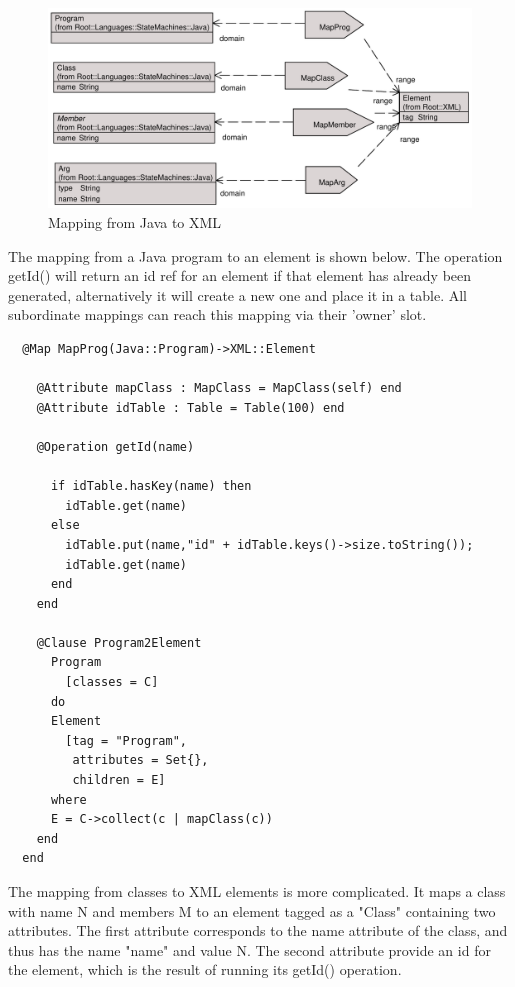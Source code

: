 \begin{figure}[htb]
\begin{center}
\includegraphics[width=14cm]{Mappings/figures/xmlmapping.pdf}
\caption{Mapping from Java to XML} \label{xmlmapping}
\end{center}
\end{figure}

The mapping from a Java program to an element is shown below. The
operation getId() will return an id ref for an element if that
element has already been generated, alternatively it will create a
new one and place it in a table. All subordinate mappings can
reach this mapping via their 'owner' slot.


\begin{lstlisting}
  @Map MapProg(Java::Program)->XML::Element

    @Attribute mapClass : MapClass = MapClass(self) end
    @Attribute idTable : Table = Table(100) end

    @Operation getId(name)

      if idTable.hasKey(name) then
        idTable.get(name)
      else
        idTable.put(name,"id" + idTable.keys()->size.toString());
        idTable.get(name)
      end
    end

    @Clause Program2Element
      Program
        [classes = C]
      do
      Element
        [tag = "Program",
         attributes = Set{},
         children = E]
      where
      E = C->collect(c | mapClass(c))
    end
  end
\end{lstlisting}
The mapping from classes to XML elements is more complicated. It
maps a class with name N and members M to an element tagged as a
"Class" containing two attributes. The first attribute corresponds
to the name attribute of the class, and thus has the name "name"
and value N. The second attribute provide an id for the element,
which is the result of running its getId() operation.


